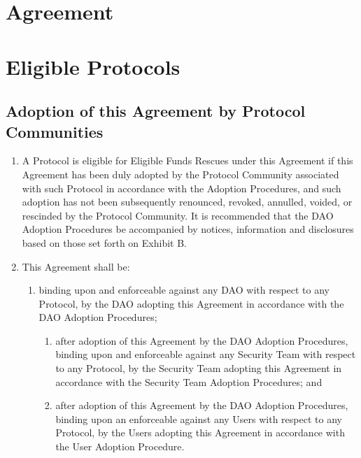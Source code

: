 \documentclass{article}
\begin{document}
\section*{Agreement}\label{sec:agreement}

\section{Eligible Protocols}\label{sec:eligible}

\subsection{Adoption of this Agreement by Protocol Communities}\label{subsec:adoption}

\begin{enumerate}[label=\Alph*.]
    \item A Protocol is eligible for Eligible Funds Rescues under this Agreement if this Agreement has been duly adopted by the Protocol Community associated with such Protocol in accordance with the Adoption Procedures, and such adoption has not been subsequently renounced, revoked, annulled, voided, or rescinded by the Protocol Community. It is recommended that the DAO Adoption Procedures be accompanied by notices, information and disclosures based on those set forth on Exhibit B.

    \item This Agreement shall be:

          \begin{enumerate}
              \item binding upon and enforceable against any DAO with respect to any Protocol, by the DAO adopting this Agreement in accordance with the DAO Adoption Procedures;

                    \begin{enumerate}
                        \item after adoption of this Agreement by the DAO Adoption Procedures, binding upon and enforceable against any Security Team with respect to any Protocol, by the Security Team adopting this Agreement in accordance with the Security Team Adoption Procedures; and

                        \item after adoption of this Agreement by the DAO Adoption Procedures, binding upon an enforceable against any Users with respect to any Protocol, by the Users adopting this Agreement in accordance with the User Adoption Procedure.


\end{enumerate}
\end{enumerate}
\end{enumerate}
\end{document}
